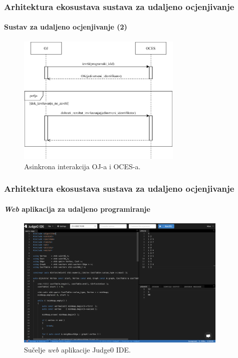 \documentclass{beamer}
\newif\ifplacelogo
\begin{document}
\begin{frame}
\frametitle{Arhitektura ekosustava sustava za udaljeno ocjenjivanje}
\framesubtitle{Sustav za udaljeno ocjenjivanje (2)}
\begin{figure}[htb]
	\centering
	\includegraphics[width=0.7\textwidth]{images/Async Interakcija.pdf}
	\caption{
		Asinkrona interakcija OJ-a i OCES-a.
	}
\end{figure}
\end{frame}

\placelogofalse
\begin{frame}
\frametitle{Arhitektura ekosustava sustava za udaljeno ocjenjivanje}
\framesubtitle{\textit{Web} aplikacija za udaljeno programiranje}
\begin{figure}[htb]
	\centering
	\includegraphics[width=0.9\textwidth]{images/Judge0 IDE UI.png}
	\caption{
		Sučelje \textit{web} aplikacije Judge0 IDE.
	}
\end{figure}
\end{frame}
\placelogotrue
\end{document}
